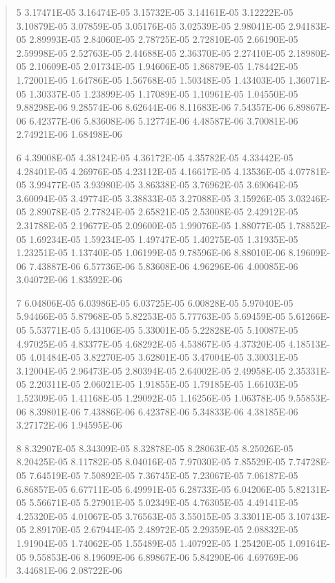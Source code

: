 \documentclass[letterpaper,10pt,english]{sphinxmanual}
\begin{document}
\begin{quote}
\begin{DUlineblock}{0em}
\begin{DUlineblock}{\DUlineblockindent}
\item[] 5   3.17471E-05  3.16474E-05  3.15732E-05  3.14161E-05  3.12222E-05  3.10879E-05  3.07859E-05  3.05176E-05  3.02539E-05  2.98041E-05  2.94183E-05  2.89993E-05  2.84060E-05  2.78725E-05  2.72810E-05  2.66190E-05  2.59998E-05  2.52763E-05  2.44688E-05  2.36370E-05  2.27410E-05  2.18980E-05  2.10609E-05  2.01734E-05  1.94606E-05  1.86879E-05  1.78442E-05  1.72001E-05  1.64786E-05  1.56768E-05  1.50348E-05  1.43403E-05  1.36071E-05  1.30337E-05  1.23899E-05  1.17089E-05  1.10961E-05  1.04550E-05  9.88298E-06  9.28574E-06  8.62644E-06  8.11683E-06  7.54357E-06  6.89867E-06  6.42377E-06  5.83608E-06  5.12774E-06  4.48587E-06  3.70081E-06  2.74921E-06  1.68498E-06
\item[] 6   4.39008E-05  4.38124E-05  4.36172E-05  4.35782E-05  4.33442E-05  4.28401E-05  4.26976E-05  4.23112E-05  4.16617E-05  4.13536E-05  4.07781E-05  3.99477E-05  3.93980E-05  3.86338E-05  3.76962E-05  3.69064E-05  3.60094E-05  3.49774E-05  3.38833E-05  3.27088E-05  3.15926E-05  3.03246E-05  2.89078E-05  2.77824E-05  2.65821E-05  2.53008E-05  2.42912E-05  2.31788E-05  2.19677E-05  2.09600E-05  1.99076E-05  1.88077E-05  1.78852E-05  1.69234E-05  1.59234E-05  1.49747E-05  1.40275E-05  1.31935E-05  1.23251E-05  1.13740E-05  1.06199E-05  9.78596E-06  8.88010E-06  8.19609E-06  7.43887E-06  6.57736E-06  5.83608E-06  4.96296E-06  4.00085E-06  3.04072E-06  1.83592E-06
\item[] 7   6.04806E-05  6.03986E-05  6.03725E-05  6.00828E-05  5.97040E-05  5.94466E-05  5.87968E-05  5.82253E-05  5.77763E-05  5.69459E-05  5.61266E-05  5.53771E-05  5.43106E-05  5.33001E-05  5.22828E-05  5.10087E-05  4.97025E-05  4.83377E-05  4.68292E-05  4.53867E-05  4.37320E-05  4.18513E-05  4.01484E-05  3.82270E-05  3.62801E-05  3.47004E-05  3.30031E-05  3.12004E-05  2.96473E-05  2.80394E-05  2.64002E-05  2.49958E-05  2.35331E-05  2.20311E-05  2.06021E-05  1.91855E-05  1.79185E-05  1.66103E-05  1.52309E-05  1.41168E-05  1.29092E-05  1.16256E-05  1.06378E-05  9.55853E-06  8.39801E-06  7.43886E-06  6.42378E-06  5.34833E-06  4.38185E-06  3.27172E-06  1.94595E-06
\item[] 8   8.32907E-05  8.34309E-05  8.32878E-05  8.28063E-05  8.25026E-05  8.20425E-05  8.11782E-05  8.04016E-05  7.97030E-05  7.85529E-05  7.74728E-05  7.64519E-05  7.50892E-05  7.36745E-05  7.23067E-05  7.06187E-05  6.86857E-05  6.67711E-05  6.49991E-05  6.28733E-05  6.04206E-05  5.82131E-05  5.56671E-05  5.27901E-05  5.02349E-05  4.76305E-05  4.49141E-05  4.25320E-05  4.01067E-05  3.76563E-05  3.55015E-05  3.33011E-05  3.10743E-05  2.89170E-05  2.67944E-05  2.48972E-05  2.29359E-05  2.08832E-05  1.91904E-05  1.74062E-05  1.55489E-05  1.40792E-05  1.25420E-05  1.09164E-05  9.55853E-06  8.19609E-06  6.89867E-06  5.84290E-06  4.69769E-06  3.44681E-06  2.08722E-06

\end{DUlineblock}
\end{DUlineblock}
\end{quote}
\end{document}
